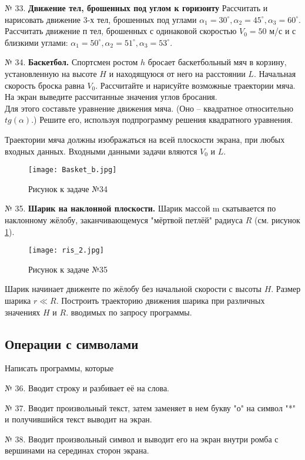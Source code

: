 № 33. {\bf Движение тел, брошенных под углом к горизонту} Рассчитать и нарисовать движение 3-х тел, брошенных под углами $\alpha_1 =30^\circ, \alpha_2 = 45^\circ, \alpha_3 =60^\circ$.  Рассчитать движение $п$ тел, брошенных с одинаковой скоростью   $V_0=50$ м/с  и с близкими углами: $\alpha_1 = 50^\circ, \alpha_2 = 51^\circ, \alpha_3 = 53^\circ$.

№ 34. {\bf Баскетбол.}
Спортсмен ростом $h$ бросает баскетбольный мяч в корзину, установленную на высоте $H$ и находящуюся от него на расстоянии $L$. Начальная скорость броска равна $V_0$. Рассчитайте и нарисуйте возможные траектории мяча. На экран выведите рассчитанные значения углов бросания.\\
Для этого составьте уравнение движения мяча. (Оно -- квадратное относительно $tg(\alpha)$.)  Решите его, используя подпрограмму решения квадратного уравнения.

Траектории мяча должны изображаться на всей плоскости экрана, при любых входных данных. Входными данными задачи  вляются  $V_0$ и $L$.

\begin{figure}[!h]
\centerline{
\texttt{[image: Basket\_b.jpg]}}
\caption{Рисунок к задаче №34}
\label{ris2}
\end{figure}

№ 35. {\bf Шарик на наклонной плоскости.}
Шарик массой m скатывается по наклонному жёлобу, заканчивающемуся "мёртвой петлёй" радиуса $R$ (см. рисунок \ref{ris2}). 
\begin{figure}[!hb]
\centerline{
\texttt{[image: ris\_2.jpg]}}
\caption{Рисунок к задаче №35}
\label{ris3}
\end{figure}
Шарик начинает движенте по жёлобу без начальной скорости с высоты $H$. Размер шарика $r \ll R$. Построить траекторию движения шарика при различных значениях $H$ и $R$. вводимых по запросу программы.

\subsection{Операции с символами}

Написать программы, которые

№ 36. Вводит строку и разбивает её на слова.

№ 37. Вводит произвольный текст, затем заменяет в нем букву "о" на   символ "*" и получившийся текст выводит на экран.

№ 38. Вводит произвольный символ и выводит его на экран внутри ромба с вершинами на серединах сторон экрана.


